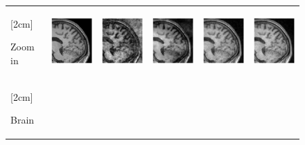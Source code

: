 \documentclass[review]{elsarticle}
\begin{document}
\begin{figure}[H]
\begin{raggedright}
\begin{tabular}{>{\centering}b{0.2cm}lcccc}
			 \multirow{1}{0.2cm}[2cm]{\begin{turn}{90} {\footnotesize Zoom in} \end{turn}} &
			
			 \includegraphics[width=2.5cm]{include/grp2/factor6/022-Guys-0701-T1/022-Guys-0701-T1_images__zoom_50} &
			 \includegraphics[width=2.5cm]{include/grp2/factor6/022-Guys-0701-T1/022-Guys-0701-T1_images__zeroPadding_zoom_50} & 
			 \includegraphics[width=2.5cm]{include/grp2/factor6/022-Guys-0701-T1/022-Guys-0701-T1_images__CS_zoom_50} & \includegraphics[width=2.5cm]{include/grp2/factor6/022-Guys-0701-T1/022-Guys-0701-T1_images__CNNL2_zoom_50} & \includegraphics[width=2.5cm]{include/grp2/factor6/022-Guys-0701-T1/022-Guys-0701-T1_images__predict_zoom_50}
			 
			 \tabularnewline
			 
			\multirow{2}{0.2cm}[2cm]{\begin{turn}{90} {\footnotesize Brain} \end{turn}} & 
 			

\end{tabular}
\end{raggedright}
\end{figure}
\end{document}
